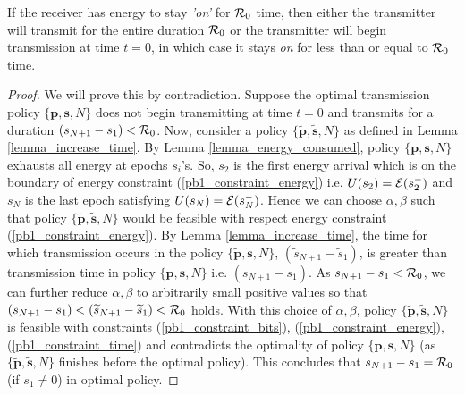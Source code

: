 \begin{lemma}
If the receiver has energy to stay \textit{'on'} for $\mathcal{R}_0$ time, then either the transmitter will transmit for the entire duration $\mathcal{R}_0$ or the transmitter will begin transmission at time $t=0$, in which case it stays \textit{on} for less than or equal to $\mathcal{R}_0$ time. 
\label{transmission_duration}
\end{lemma}
\begin{proof}
We will prove this by contradiction. Suppose the optimal transmission policy $\{\textbf{p},\textbf{s},N\}$ does not begin transmitting at time $t=0$ and transmits for a duration $(s_{N+1}-s_1)< \mathcal{R}_0$. Now, consider a policy $\{\bm{\widetilde{p}},\bm{\widetilde{s}},N\}$ as defined in Lemma \ref{lemma_increase_time}. By Lemma \ref{lemma_energy_consumed}, policy $\{\textbf{p},\textbf{s},N\}$ exhausts all energy at epochs $s_i$'s. So, $s_{2}$ is the first energy arrival which is on the boundary of energy constraint (\ref{pb1_constraint_energy}) i.e. $U(s_2)=\mathcal{E}(s_2^-)$ and $s_{N}$ is the last epoch satisfying $U(s_N)=\mathcal{E}(s_N^-)$. Hence we can choose $\alpha ,\beta$ such that policy $\{\bm{\widetilde{p}},\bm{\widetilde{s}},N\}$ would be feasible with respect energy constraint (\ref{pb1_constraint_energy}). By Lemma \ref{lemma_increase_time}, the time for which transmission occurs in the policy $\{\bm{\widetilde{p}},\bm{\widetilde{s}},N\}$, $\left( \widetilde{s}_{N+1}-\widetilde{s}_1\right)$, is greater than transmission time in policy $\{\textbf{p},\textbf{s},N\}$ i.e. $(s_{N+1}-s_1)$. As $s_{N+1}-s_1<\mathcal{R}_0$, we can further reduce $\alpha,\beta$ to arbitrarily small positive values so that $(s_{N+1}-s_1)<\left( \widetilde{s}_{N+1}-\widetilde{s}_1\right)<\mathcal{R}_0$ holds. With this choice of $\alpha,\beta$, policy $\{\bm{\widetilde{p}},\bm{\widetilde{s}},N\}$ is feasible with constraints  (\ref{pb1_constraint_bits}), (\ref{pb1_constraint_energy}), (\ref{pb1_constraint_time}) and contradicts the optimality of policy $\{\textbf{p},\textbf{s},N\}$ (as $\{\bm{\widetilde{p}},\bm{\widetilde{s}},N\}$ finishes before the optimal policy). This concludes that $s_{N+1}-s_1=\mathcal{R}_0$ (if $s_1\neq 0$) in optimal policy.
\end{proof}